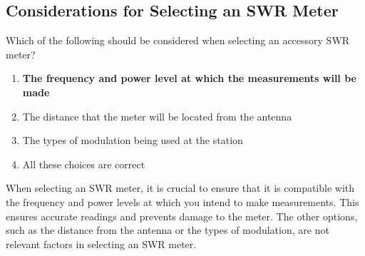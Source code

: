 \subsection{Considerations for Selecting an SWR Meter}
\label{T4A02}

\begin{tcolorbox}[colback=gray!10!white,colframe=black!75!black,title=T4A02]
Which of the following should be considered when selecting an accessory SWR meter?
\begin{enumerate}[noitemsep]
    \item \textbf{The frequency and power level at which the measurements will be made}
    \item The distance that the meter will be located from the antenna
    \item The types of modulation being used at the station
    \item All these choices are correct
\end{enumerate}
\end{tcolorbox}

When selecting an SWR meter, it is crucial to ensure that it is compatible with the frequency and power levels at which you intend to make measurements. This ensures accurate readings and prevents damage to the meter. The other options, such as the distance from the antenna or the types of modulation, are not relevant factors in selecting an SWR meter.